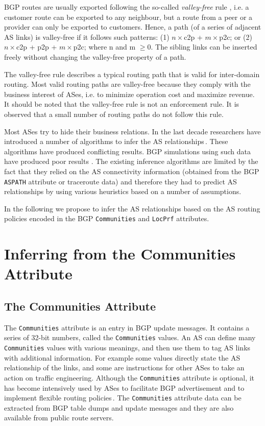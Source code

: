 \documentclass[conference]{IEEEtran}
\begin{document}
BGP routes are usually exported following the so-called \textit{valley-free} rule \cite{gao1}, i.e. a customer route can be exported to any neighbour, but a route from a peer or a provider can only be exported to customers. Hence, a path (of a series of adjacent AS links) is valley-free if it follows such patterns:
(1) $n\times$c2p + $m\times$p2c; or (2) $n\times$c2p + p2p + $m\times$p2c; where n and m $\geq0$.
The sibling links can be inserted freely without changing the valley-free property of a path. 

The valley-free rule describes a typical routing path that is valid for inter-domain routing. Most valid routing paths are valley-free because they comply with the business interest of ASes, i.e. to minimize operation cost and maximize revenue. 
It should be noted that the valley-free rule is not an enforcement rule. It is observed that a small number of routing paths do not follow this rule.

Most ASes try to hide their business relations. In the last decade researchers have introduced a number of algorithms to infer the AS  relationships\,\cite{gao1,Xia:2004, Subramanian1,Erlebach1, Battista2, Dimitropoulos2, Oliveira2, Weinsberg1}. These algorithms have produced conflicting results. BGP simulations using such data have produced poor results \cite{Muhlbauer:2006,Muhlbauer:2007}.
The existing inference algorithms are  limited by the fact that they  relied on the AS connectivity information (obtained from the BGP {\tt ASPATH} attribute or traceroute data) and therefore they had to predict AS relationships by using various heuristics based on a number of assumptions. 


In the following we propose to infer the AS relationships based on the AS routing policies encoded in the BGP {\tt Communities} and {\tt LocPrf}  attributes.

\section{Inferring from the {Communities} Attribute}

\subsection{The {Communities} Attribute}

The {\tt Communities} attribute is an entry in BGP update messages. It contains a series of 32-bit numbers, called the {\tt Communities} values. An AS can define many  {\tt Communities}  values with various meanings, and then use them to tag AS links with additional information. For example some values  directly state the AS relationship of the links, and some are instructions for  other ASes to take an action on traffic engineering. Although the {\tt Communities} attribute is optional, it has become intensively used by ASes to facilitate BGP advertisement and to implement flexible routing  policies\,\cite{Donnet2}. 
The {\tt Communities} attribute data can be extracted from  BGP table dumps and update messages and they are also available from public route servers.
\end{document}
